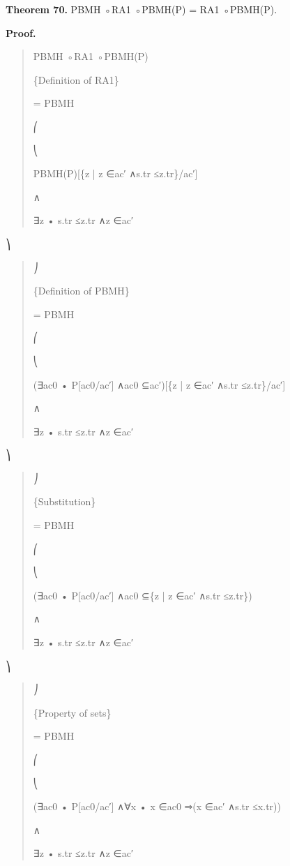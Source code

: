 \documentclass[11pt]{article}
\begin{document}
\noindent\textbf{Theorem 70.} PBMH ◦RA1 ◦PBMH(P) = RA1 ◦PBMH(P).


\noindent\textbf{Proof.}


\begin{quote}\small\raggedright
PBMH ◦RA1 ◦PBMH(P)
\par
\{Definition of RA1\}
\par
= PBMH
\par
⎛
\par
⎝
\par
PBMH(P)[\{z | z ∈ac′ ∧s.tr ≤z.tr\}/ac′]
\par
∧
\par
∃z • s.tr ≤z.tr ∧z ∈ac′
\end{quote}

⎞

\begin{quote}\small\raggedright
⎠
\par
\{Definition of PBMH\}
\par
= PBMH
\par
⎛
\par
⎝
\par
(∃ac0 • P[ac0/ac′] ∧ac0 ⊆ac′)[\{z | z ∈ac′ ∧s.tr ≤z.tr\}/ac′]
\par
∧
\par
∃z • s.tr ≤z.tr ∧z ∈ac′
\end{quote}

⎞

\begin{quote}\small\raggedright
⎠
\par
\{Substitution\}
\par
= PBMH
\par
⎛
\par
⎝
\par
(∃ac0 • P[ac0/ac′] ∧ac0 ⊆\{z | z ∈ac′ ∧s.tr ≤z.tr\})
\par
∧
\par
∃z • s.tr ≤z.tr ∧z ∈ac′
\end{quote}

⎞

\begin{quote}\small\raggedright
⎠
\par
\{Property of sets\}
\par
= PBMH
\par
⎛
\par
⎝
\par
(∃ac0 • P[ac0/ac′] ∧∀x • x ∈ac0 ⇒(x ∈ac′ ∧s.tr ≤x.tr))
\par
∧
\par
∃z • s.tr ≤z.tr ∧z ∈ac′
\end{quote}
\end{document}

